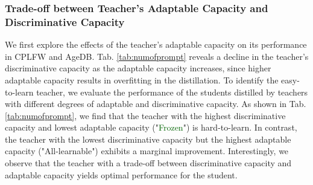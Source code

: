 \documentclass[sigconf]{acmart}
\begin{document}
\subsubsection{Trade-off between Teacher's Adaptable Capacity and Discriminative Capacity}
We first explore the effects of the teacher's adaptable capacity on its performance in CPLFW and AgeDB. Tab. \ref{tab:numofprompt} reveals a decline in the teacher's discriminative capacity as the adaptable capacity increases, since higher adaptable capacity results in overfitting in the distillation. To identify the easy-to-learn teacher, we evaluate the performance of the students distilled by teachers with different degrees of adaptable and discriminative capacity. As shown in Tab. \ref{tab:numofprompt}, we find that the teacher with the highest discriminative capacity and lowest adaptable capacity ("\textcolor{darkgreen}{Frozen}") is hard-to-learn. In contrast, the teacher with the lowest discriminative capacity but the highest adaptable capacity ("\textcolor{dblue}{All-learnable}") exhibits a marginal improvement. Interestingly, we observe that the teacher with a trade-off between discriminative capacity and adaptable capacity yields optimal performance for the student.
\label{section:numofprompt}
\end{document}
